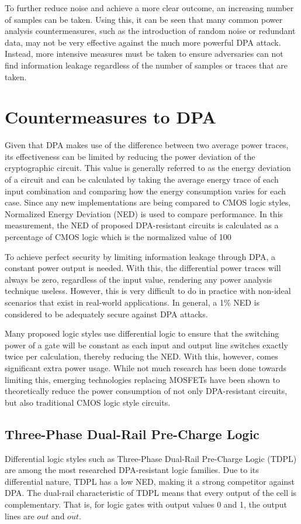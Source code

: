 \documentclass[conference, 12pt]{IEEEtran}
\begin{document}
		To further reduce noise and achieve a more clear outcome, an increasing number of samples can be taken. Using this, it can be seen that many common power analysis countermeasures, such as the introduction of random noise or redundant data, may not be very effective against the much more powerful DPA attack. Instead, more intensive measures must be taken to ensure adversaries can not find information leakage regardless of the number of samples or traces that are taken.

	\section{Countermeasures to DPA}
		Given that DPA makes use of the difference between two average power traces, its effectiveness can be limited by reducing the power deviation of the cryptographic circuit. This value is generally referred to as the energy deviation of a circuit and can be calculated by taking the average energy trace of each input combination and comparing how the energy consumption varies for each case. Since any new implementations are being compared to CMOS logic styles, Normalized Energy Deviation (NED) is used to compare performance. In this measurement, the NED of proposed DPA-resistant circuits is calculated as a percentage of CMOS logic which is the normalized value of 100%

		To achieve perfect security by limiting information leakage through DPA, a constant power output is needed. With this, the differential power traces will always be zero, regardless of the input value, rendering any power analysis technique useless. However, this is very difficult to do in practice with non-ideal scenarios that exist in real-world applications. In general, a 1\% NED is considered to be adequately secure against DPA attacks.

		Many proposed logic styles use differential logic to ensure that the switching power of a gate will be constant as each input and output line switches exactly twice per calculation, thereby reducing the NED. With this, however, comes significant extra power usage. While not much research has been done towards limiting this, emerging technologies replacing MOSFETs have been shown to theoretically reduce the power consumption of not only DPA-resistant circuits, but also traditional CMOS logic style circuits.


		\subsection{Three-Phase Dual-Rail Pre-Charge Logic}
			Differential logic styles such as Three-Phase Dual-Rail Pre-Charge Logic (TDPL) are among the most researched DPA-resistant logic families. Due to its differential nature, TDPL has a low NED, making it a strong competitor against DPA. The dual-rail characteristic of TDPL means that every output of the cell is complementary. That is, for logic gates with output values 0 and 1, the output lines are $out$ and $\overline{out}$. 
\end{document}
